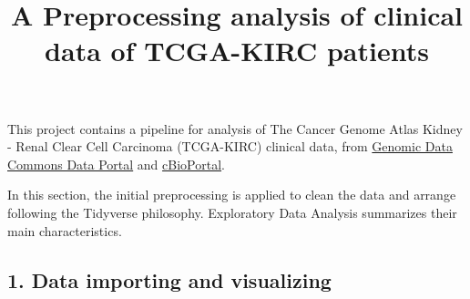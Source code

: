 \documentclass[]{article}
\title{A Preprocessing analysis of clinical data of TCGA-KIRC patients}
\author{}
\date{\vspace{-2.5em}}
\newenvironment{Shaded}{\begin{snugshade}}{\end{snugshade}}
\newcommand{\KeywordTok}[1]{\textcolor[rgb]{0.13,0.29,0.53}{\textbf{#1}}}
\newcommand{\DataTypeTok}[1]{\textcolor[rgb]{0.13,0.29,0.53}{#1}}
\newcommand{\DecValTok}[1]{\textcolor[rgb]{0.00,0.00,0.81}{#1}}
\newcommand{\StringTok}[1]{\textcolor[rgb]{0.31,0.60,0.02}{#1}}
\newcommand{\CommentTok}[1]{\textcolor[rgb]{0.56,0.35,0.01}{\textit{#1}}}
\newcommand{\OperatorTok}[1]{\textcolor[rgb]{0.81,0.36,0.00}{\textbf{#1}}}
\newcommand{\NormalTok}[1]{#1}
\begin{document}
\maketitle

This project contains a pipeline for analysis of The Cancer Genome Atlas
Kidney - Renal Clear Cell Carcinoma (TCGA-KIRC) clinical data, from
\href{https://portal.gdc.cancer.gov/exploration?filters=\%7B\%22op\%22\%3A\%22and\%22\%2C\%22content\%22\%3A\%5B\%7B\%22op\%22\%3A\%22in\%22\%2C\%22content\%22\%3A\%7B\%22field\%22\%3A\%22cases.project.project_id\%22\%2C\%22value\%22\%3A\%5B\%22TCGA-KIRC\%22\%5D\%7D\%7D\%5D\%7D}{Genomic
Data Commons Data Portal} and
\href{https://www.cbioportal.org/study/summary?id=kirp_tcga}{cBioPortal}.

In this section, the initial preprocessing is applied to clean the data
and arrange following the Tidyverse philosophy. Exploratory Data
Analysis summarizes their main characteristics.

\begin{Shaded}
\end{Shaded}

\subsection{1. Data importing and
visualizing}\label{data-importing-and-visualizing}
\end{document}
